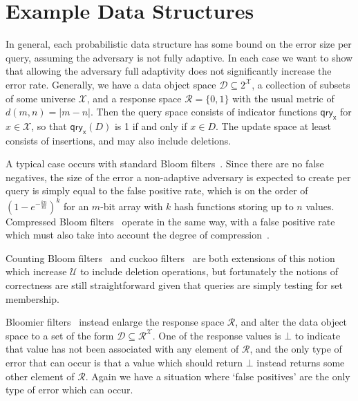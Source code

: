\section{Example Data Structures}

In general, each probabilistic data structure has some bound on the error size per query, assuming the adversary is not fully adaptive. In each case we want to show that allowing the adversary full adaptivity does not significantly increase the error rate. Generally, we have a data object space $\mathcal{D} \subseteq 2^\mathcal{X}$, a collection of subsets of some universe $\mathcal{X}$, and a response space $\mathcal{R} = \{0,1\}$ with the usual metric of $d(m,n) = |m-n|$. Then the query space consists of indicator functions $\mathsf{qry_x}$ for $x \in \mathcal{X}$, so that $\mathsf{qry_x}(D)$ is 1 if and only if $x \in D$. The update space at least consists of insertions, and may also include deletions.

A typical case occurs with standard Bloom filters~\cite{bloomfilter}. Since there are no false negatives, the size of the error a non-adaptive adversary is expected to create per query is simply equal to the false positive rate, which is on the order of $(1-e^{-\frac{kn}{m}})^k$ for an $m$-bit array with $k$ hash functions storing up to $n$ values. Compressed Bloom filters~\cite{xxx} operate in the same way, with a false positive rate which must also take into account the degree of compression~. 

Counting Bloom filters~\cite{xxx} and cuckoo filters~\cite{xxx} are both extensions of this notion which increase $\mathcal{U}$ to include deletion operations, but fortunately the notions of correctness are still straightforward given that queries are simply testing for set membership.   

Bloomier filters~\cite{xxx} instead enlarge the response space $\mathcal{R}$, and alter the data object space to a set of the form $\mathcal{D} \subseteq \mathcal{R}^\mathcal{X}$.  One of the response values is $\bot$ to indicate that value has not been associated with any element of $\mathcal{R}$, and the only type of error that can occur is that a value which should return $\bot$ instead returns some other element of $\mathcal{R}$. Again we have a situation where `false positives' are the only type of error which can occur.

